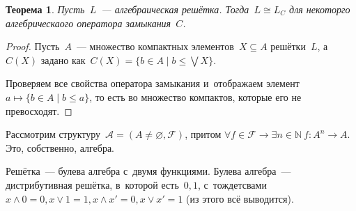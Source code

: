 \documentclass{article}
\newtheorem{theorem}{Теорема}
\renewcommand{\le}{\leqslant}
\begin{document}
\begin{theorem}
  Пусть~$L$~--- алгебраическая решётка. Тогда~$L \cong L_C$ для некоторго
  алгебрическаого оператора замыкания~$C$.
\end{theorem}
\begin{proof}
  Пусть~$A$~--- множество компактных элементов~$X \subseteq A$ решётки~$L$,
  а~$C(X)$ задано как~$C(X) = \{ b \in A \mid b \le \bigvee X \}$.

  Проверяем все свойства оператора замыкания и~отображаем элемент~$a \mapsto \{
  b \in A \mid b \le a \}$, то есть во множество компактов, которые его не
  превосходят.
\end{proof}

Рассмотрим структуру~$\mathcal{A} = (A \ne \varnothing, \mathcal{F})$, притом
$\forall f \in \mathcal{F} \rightarrow \exists n \in \mathbb{N}~f: A^n
\rightarrow A$. Это, собственно, алгебра.

Решётка~--- булева алгебра с~двумя функциями. Булева алгебра~--- дистрибутивная
решётка, в~которой есть~$0, 1$, с~тождетсвами~$x \land 0 = 0, x \lor 1 = 1, x
\land x' = 0, x \lor x' = 1$ (из этого всё выводится).
\end{document}
